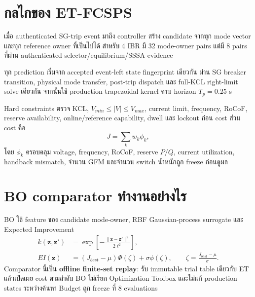 \documentclass[12pt,a4paper]{article}
\newcommand{\vect}[1]{\boldsymbol{#1}}
\begin{document}
\section{กลไกของ ET-FCSPS}
เมื่อ authenticated SG-trip event มาถึง controller สร้าง candidate จากทุก mode vector และทุก reference owner ที่เป็นไปได้ สำหรับ 4 IBR มี 32 mode-owner pairs แต่มี 8 pairs ที่ผ่าน authenticated selector/equilibrium/SSSA evidence
\begin{center}
\end{center}
ทุก prediction เริ่มจาก accepted event-left state fingerprint เดียวกัน ผ่าน SG breaker transition, physical mode transfer, post-trip dispatch และ full-KCL right-limit solve เดียวกัน จากนั้นใช้ production trapezoidal kernel ครบ horizon $T_p=0.25$ s

Hard constraints ตรวจ KCL, $V_{min}\le|V|\le V_{max}$, current limit, frequency, RoCoF, reserve availability, online/reference capability, dwell และ lockout ก่อน cost ส่วน cost คือ
\begin{equation}
J=\sum_{k}w_k\phi_k,
\end{equation}
โดย $\phi_k$ ครอบคลุม voltage, frequency, RoCoF, reserve $P/Q$, current utilization, handback mismatch, จำนวน GFM และจำนวน switch น้ำหนักถูก freeze ก่อนดูผล

\section{BO comparator ทำงานอย่างไร}
BO ใช้ feature ของ candidate mode-owner, RBF Gaussian-process surrogate และ Expected Improvement
\begin{align}
k(\vect{z},\vect{z}')&=\exp\!\left[-\frac{\|\vect{z}-\vect{z}'\|^2}{2\ell^2}\right],\\
EI(\vect{z})&=(J_{best}-\mu)\Phi(\zeta)+\sigma\phi(\zeta),\qquad
\zeta=\frac{J_{best}-\mu}{\sigma}.
\end{align}
Comparator นี้เป็น \textbf{offline finite-set replay}: รับ immutable trial table เดียวกับ ET แล้วเปิดเผย cost ตามลำดับ BO ไม่เรียก Optimization Toolbox และไม่แก้ production states ระหว่างค้นหา Budget ถูก freeze ที่ 8 evaluations
\end{document}
